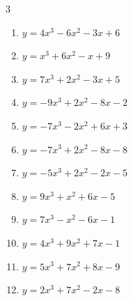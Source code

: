 \begin{multicols}{3}
\begin{enumerate}

  \item $y=4x^{3}-6x^{2}-3x+6$


  \item $y=x^{3}+6x^{2}-x+9$


  \item $y=7x^{3}+2x^{2}-3x+5$


  \item $y=-9x^{3}+2x^{2}-8x-2$


  \item $y=-7x^{3}-2x^{2}+6x+3$


  \item $y=-7x^{3}+2x^{2}-8x-8$


  \item $y=-5x^{3}+2x^{2}-2x-5$


  \item $y=9x^{3}+x^{2}+6x-5$


\columnbreak %

\resetques

  \item $y=7x^{3}-x^{2}-6x-1$


  \item $y=4x^{3}+9x^{2}+7x-1$


  \item $y=5x^{3}+7x^{2}+8x-9$


  \item $y=2x^{3}+7x^{2}-2x-8$


\end{enumerate}
\end{multicols}

